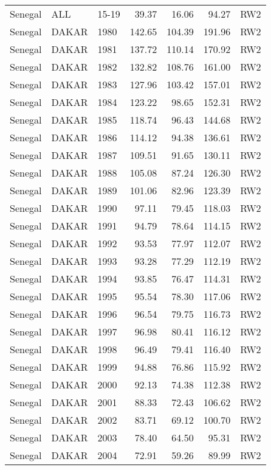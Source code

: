 \begin{longtable}{lllrrrl}
  Senegal & ALL & 15-19 & 39.37 & 16.06 & 94.27 & RW2 \\ 
  Senegal & DAKAR & 1980 & 142.65 & 104.39 & 191.96 & RW2 \\ 
  Senegal & DAKAR & 1981 & 137.72 & 110.14 & 170.92 & RW2 \\ 
  Senegal & DAKAR & 1982 & 132.82 & 108.76 & 161.00 & RW2 \\ 
  Senegal & DAKAR & 1983 & 127.96 & 103.42 & 157.01 & RW2 \\ 
  Senegal & DAKAR & 1984 & 123.22 & 98.65 & 152.31 & RW2 \\ 
  Senegal & DAKAR & 1985 & 118.74 & 96.43 & 144.68 & RW2 \\ 
  Senegal & DAKAR & 1986 & 114.12 & 94.38 & 136.61 & RW2 \\ 
  Senegal & DAKAR & 1987 & 109.51 & 91.65 & 130.11 & RW2 \\ 
  Senegal & DAKAR & 1988 & 105.08 & 87.24 & 126.30 & RW2 \\ 
  Senegal & DAKAR & 1989 & 101.06 & 82.96 & 123.39 & RW2 \\ 
  Senegal & DAKAR & 1990 & 97.11 & 79.45 & 118.03 & RW2 \\ 
  Senegal & DAKAR & 1991 & 94.79 & 78.64 & 114.15 & RW2 \\ 
  Senegal & DAKAR & 1992 & 93.53 & 77.97 & 112.07 & RW2 \\ 
  Senegal & DAKAR & 1993 & 93.28 & 77.29 & 112.19 & RW2 \\ 
  Senegal & DAKAR & 1994 & 93.85 & 76.47 & 114.31 & RW2 \\ 
  Senegal & DAKAR & 1995 & 95.54 & 78.30 & 117.06 & RW2 \\ 
  Senegal & DAKAR & 1996 & 96.54 & 79.75 & 116.73 & RW2 \\ 
  Senegal & DAKAR & 1997 & 96.98 & 80.41 & 116.12 & RW2 \\ 
  Senegal & DAKAR & 1998 & 96.49 & 79.41 & 116.40 & RW2 \\ 
  Senegal & DAKAR & 1999 & 94.88 & 76.86 & 115.92 & RW2 \\ 
  Senegal & DAKAR & 2000 & 92.13 & 74.38 & 112.38 & RW2 \\ 
  Senegal & DAKAR & 2001 & 88.33 & 72.43 & 106.62 & RW2 \\ 
  Senegal & DAKAR & 2002 & 83.71 & 69.12 & 100.70 & RW2 \\ 
  Senegal & DAKAR & 2003 & 78.40 & 64.50 & 95.31 & RW2 \\ 
  Senegal & DAKAR & 2004 & 72.91 & 59.26 & 89.99 & RW2 \\ 

\end{longtable}
